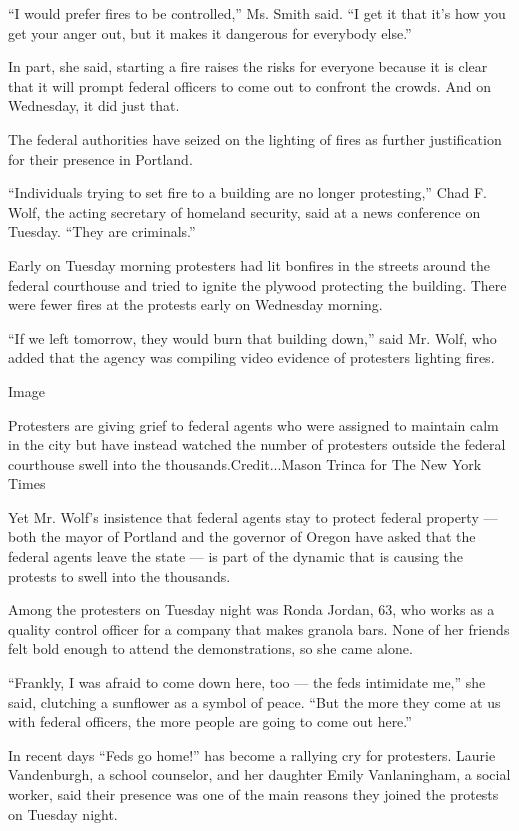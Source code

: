 ``I would prefer fires to be controlled,'' Ms. Smith said. ``I get it
that it's how you get your anger out, but it makes it dangerous for
everybody else.''

In part, she said, starting a fire raises the risks for everyone because
it is clear that it will prompt federal officers to come out to confront
the crowds. And on Wednesday, it did just that.

The federal authorities have seized on the lighting of fires as further
justification for their presence in Portland.

``Individuals trying to set fire to a building are no longer
protesting,'' Chad F. Wolf, the acting secretary of homeland security,
said at a news conference on Tuesday. ``They are criminals.''

Early on Tuesday morning protesters had lit bonfires in the streets
around the federal courthouse and tried to ignite the plywood protecting
the building. There were fewer fires at the protests early on Wednesday
morning.

``If we left tomorrow, they would burn that building down,'' said Mr.
Wolf, who added that the agency was compiling video evidence of
protesters lighting fires.

Image

Protesters are giving grief to federal agents who were assigned to
maintain calm in the city but have instead watched the number of
protesters outside the federal courthouse swell into the
thousands.Credit...Mason Trinca for The New York Times

Yet Mr. Wolf's insistence that federal agents stay to protect federal
property --- both the mayor of Portland and the governor of Oregon have
asked that the federal agents leave the state --- is part of the dynamic
that is causing the protests to swell into the thousands.

Among the protesters on Tuesday night was Ronda Jordan, 63, who works as
a quality control officer for a company that makes granola bars. None of
her friends felt bold enough to attend the demonstrations, so she came
alone.

``Frankly, I was afraid to come down here, too --- the feds intimidate
me,'' she said, clutching a sunflower as a symbol of peace. ``But the
more they come at us with federal officers, the more people are going to
come out here.''

In recent days ``Feds go home!'' has become a rallying cry for
protesters. Laurie Vandenburgh, a school counselor, and her daughter
Emily Vanlaningham, a social worker, said their presence was one of the
main reasons they joined the protests on Tuesday night.

